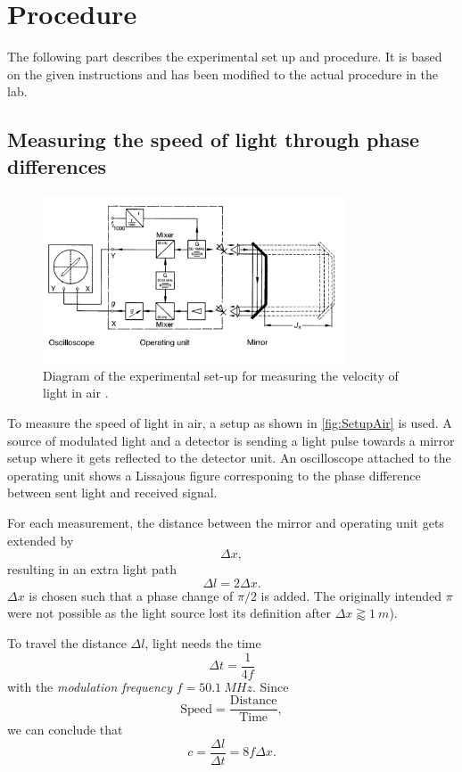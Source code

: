 \section{Procedure}
\label{sec:procedure}
The following part describes the experimental set up and procedure. It is based on the given
instructions and has been modified to the actual procedure in the lab.

\subsection{Measuring the speed of light through phase differences}
\label{sec:measuring}
\begin{figure}
    \centering
    \includegraphics[width=0.8\textwidth]{media/Setup Air.png}
    \caption{Diagram of the experimental set-up for measuring the velocity of light in air
              \cite{LabInstructions}.}
    \label{fig:SetupAir}
\end{figure}
To measure the speed of light in air, a setup as shown in \autoref{fig:SetupAir} is used. A source
of modulated light and a detector is sending a light pulse towards a mirror setup where it gets
reflected to the detector unit. An oscilloscope attached to the operating unit shows a Lissajous
figure corresponing to the phase difference between sent light and received signal.

For each measurement, the distance between the mirror and operating unit gets extended by
\[
\Delta x,
\]
resulting in an extra light path
\[
  \Delta l = 2 \Delta x.
\]
$\Delta x$ is chosen such that a phase change of $\pi / 2$ is added. The originally intended $\pi$
were not possible as the light source lost its definition after $\Delta x \gtrapprox \SI{1}{m}$).

To travel the distance $\Delta l$, light needs the time
\[
  \Delta t = \frac{1}{4f}
\]
with the \textit{modulation frequency} $f = \SI{50.1}{MHz}$. Since
\[
  \text{Speed} = \frac{\text{Distance}}{\text{Time}},
\]
we can conclude that
\begin{equation}
  c = \frac{\Delta l}{\Delta t} = 8f \Delta x.
  \label{eqn:speedoflight}
\end{equation}


